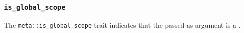 
\subsubsection{\texttt{is\_global\_scope}}

The \texttt{meta::is\_global\_scope}
trait indicates that the  passed as argument is a .



